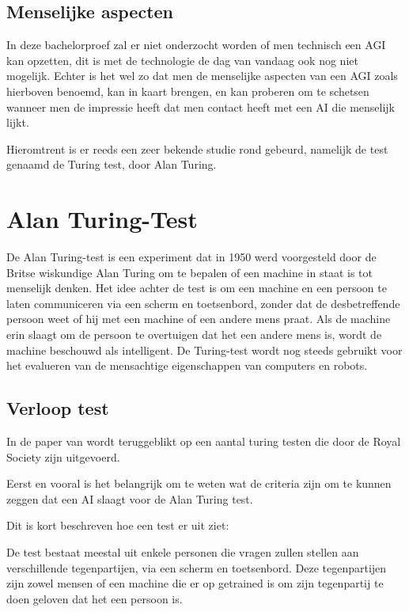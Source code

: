 \autocite{shevlin2019limits}

\newpage

\subsection{Menselijke aspecten}

In deze bachelorproef zal er niet onderzocht worden of men technisch een AGI kan opzetten, dit is met de technologie de dag van vandaag ook nog niet mogelijk. Echter is het wel zo dat men de menselijke aspecten van een AGI zoals hierboven benoemd, kan in kaart brengen, en kan proberen om te schetsen wanneer men de impressie heeft dat men contact heeft met een AI die menselijk lijkt. 

Hieromtrent is er reeds een zeer bekende  studie rond gebeurd, namelijk de test genaamd de Turing test, door Alan Turing.

\section{Alan Turing-Test}

De Alan Turing-test is een experiment dat in 1950 werd voorgesteld door de Britse wiskundige Alan Turing om te bepalen of een machine in staat is tot menselijk denken. Het idee achter de test is om een machine en een persoon te laten communiceren via een scherm en toetsenbord, zonder dat de desbetreffende persoon weet of hij met een machine of een andere mens praat. Als de machine erin slaagt om de persoon te overtuigen dat het een andere mens is, wordt de machine beschouwd als intelligent. De Turing-test wordt nog steeds gebruikt voor het evalueren van de mensachtige eigenschappen van computers en robots.

\subsection{Verloop test}

In de paper van \cite{warwick2016can} wordt teruggeblikt op een aantal turing testen die door de Royal Society zijn uitgevoerd.

Eerst en vooral is het belangrijk om te weten wat de criteria zijn om te kunnen zeggen dat een AI slaagt voor de Alan Turing test. 

Dit is kort beschreven hoe een test er uit ziet: 

De test bestaat meestal uit enkele personen die vragen zullen stellen aan verschillende tegenpartijen, via een scherm en toetsenbord. Deze tegenpartijen zijn zowel mensen of een machine die er op getrained is om zijn tegenpartij te doen geloven dat het een persoon is. 

